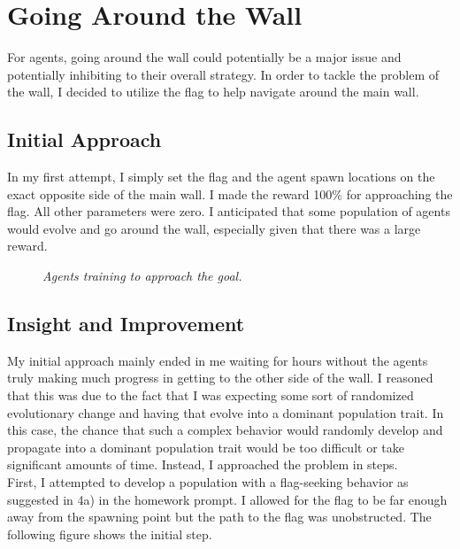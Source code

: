 \documentclass{article} %
\begin{document}
\section{Going Around the Wall}
For agents, going around the wall could potentially be a major issue and potentially inhibiting to their overall strategy. In order to tackle the problem of the wall, I decided to utilize the flag to help navigate around the main wall. 
\subsection{Initial Approach}
In my first attempt, I simply set the flag and the agent spawn locations on the exact opposite side of the main wall. I made the reward 100\% for approaching the flag. All other parameters were zero. I anticipated that some population of agents would evolve and go around the wall, especially given that there was a large reward.

\begin{figure}[H]
	\centering
		\caption{\textit{Agents training to approach the goal.}}
        \label{fig:default}
\end{figure} 

\subsection{Insight and Improvement}
My initial approach mainly ended in me waiting for hours without the agents truly making much progress in getting to the other side of the wall. I reasoned that this was due to the fact that I was expecting some sort of randomized evolutionary change and having that evolve into a dominant population trait. In this case, the chance that such a complex behavior would randomly develop and propagate into a dominant population trait would be too difficult or take significant amounts of time. Instead, I approached the problem in steps.
\\[1\baselineskip]
First, I attempted to develop a population with a flag-seeking behavior as suggested in 4a) in the homework prompt. I allowed for the flag to be far enough away from the spawning point but the path to the flag was unobstructed. The following figure shows the initial step.
\end{document}
